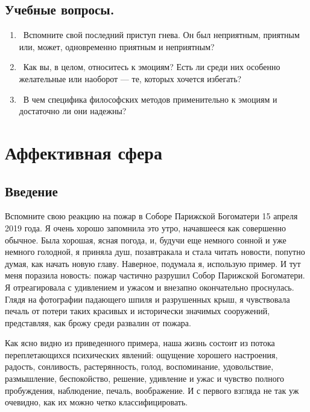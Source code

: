 \documentclass[11pt]{book}
\begin{document}
\begin{tcolorbox}

  \section{Учебные вопросы.}

  \begin{enumerate}
    \item\ Вспомните свой последний приступ гнева. Он был неприятным, приятным или, может, одновременно приятным и неприятным?
    \item\ Как вы, в целом, относитесь к эмоциям? Есть ли среди них особенно желательные или наоборот --- те, которых хочется избегать?
    \item\ В чем специфика философских методов применительно к эмоциям и достаточно ли они надежны?
  \end{enumerate}

\end{tcolorbox}

\chapter{Аффективная сфера}

\section{Введение}

Вспомните свою реакцию на пожар в Соборе Парижской Богоматери 15 апреля 2019 года. Я очень хорошо запомнила это утро, начавшееся как совершенно обычное. Была хорошая, ясная погода, и, будучи еще немного сонной и уже немного голодной, я приняла душ, позавтракала и стала читать новости, попутно думая, как начать новую главу. Наверное, подумала я, использую пример. И тут меня поразила новость: пожар частично разрушил Собор Парижской Богоматери. Я отреагировала с удивлением и ужасом и внезапно окончательно проснулась. Глядя на фотографии падающего шпиля и разрушенных крыш, я чувствовала печаль от потери таких красивых и исторически значимых сооружений, представляя, как брожу среди развалин от пожара.

Как ясно видно из приведенного примера, наша жизнь состоит из потока переплетающихся психических явлений: ощущение хорошего настроения, радость, сонливость, растерянность, голод, воспоминание, удовольствие, размышление, беспокойство, решение, удивление и ужас и чувство полного пробуждения, наблюдение, печаль, воображение. И с первого взгляда не так уж очевидно, как их можно четко классифицировать.
\end{document}
